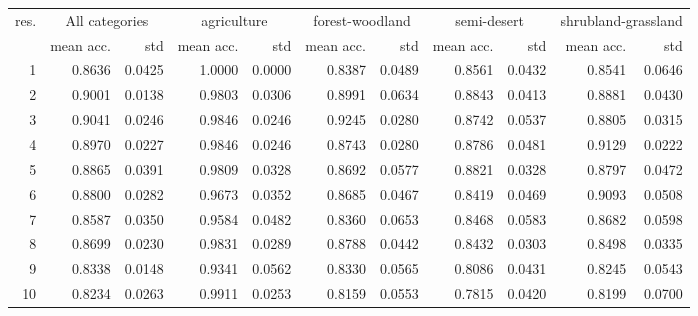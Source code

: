 \begin{tabular}{rrrrrrrrrrr}
\toprule
res. & \multicolumn{2}{c}{All categories} & \multicolumn{2}{c}{agriculture} & \multicolumn{2}{c}{forest-woodland} & \multicolumn{2}{c}{semi-desert} & \multicolumn{2}{c}{shrubland-grassland} \\
           &     mean acc. &    std &                 mean acc. &    std &                     mean acc. &    std &                 mean acc. &    std &                         mean acc. &    std \\
\midrule
         1 &   0.8636 & 0.0425 &               1.0000 & 0.0000 &                   0.8387 & 0.0489 &               0.8561 & 0.0432 &                       0.8541 & 0.0646 \\
         2 &   0.9001 & 0.0138 &               0.9803 & 0.0306 &                   0.8991 & 0.0634 &               0.8843 & 0.0413 &                       0.8881 & 0.0430 \\
         3 &   0.9041 & 0.0246 &               0.9846 & 0.0246 &                   0.9245 & 0.0280 &               0.8742 & 0.0537 &                       0.8805 & 0.0315 \\
         4 &   0.8970 & 0.0227 &               0.9846 & 0.0246 &                   0.8743 & 0.0280 &               0.8786 & 0.0481 &                       0.9129 & 0.0222 \\
         5 &   0.8865 & 0.0391 &               0.9809 & 0.0328 &                   0.8692 & 0.0577 &               0.8821 & 0.0328 &                       0.8797 & 0.0472 \\
         6 &   0.8800 & 0.0282 &               0.9673 & 0.0352 &                   0.8685 & 0.0467 &               0.8419 & 0.0469 &                       0.9093 & 0.0508 \\
         7 &   0.8587 & 0.0350 &               0.9584 & 0.0482 &                   0.8360 & 0.0653 &               0.8468 & 0.0583 &                       0.8682 & 0.0598 \\
         8 &   0.8699 & 0.0230 &               0.9831 & 0.0289 &                   0.8788 & 0.0442 &               0.8432 & 0.0303 &                       0.8498 & 0.0335 \\
         9 &   0.8338 & 0.0148 &               0.9341 & 0.0562 &                   0.8330 & 0.0565 &               0.8086 & 0.0431 &                       0.8245 & 0.0543 \\
        10 &   0.8234 & 0.0263 &               0.9911 & 0.0253 &                   0.8159 & 0.0553 &               0.7815 & 0.0420 &                       0.8199 & 0.0700 \\

\end{tabular}
